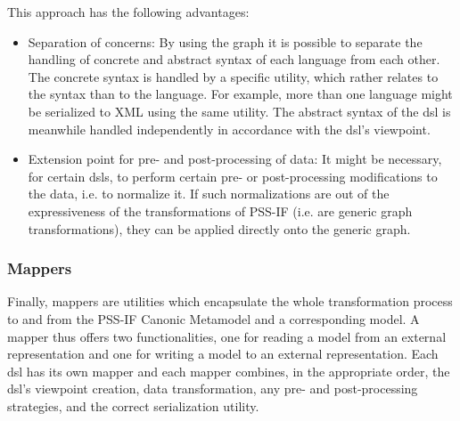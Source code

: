 This approach has the following advantages:

\begin{itemize}
\item Separation of concerns: By using the graph it is possible to separate the handling of concrete and abstract syntax of each language from each other. The concrete syntax is handled by a specific utility, which rather relates to the syntax than to the language. For example, more than one language might be serialized to XML using the same utility. The abstract syntax of the \gls{dsl} is meanwhile handled independently in accordance with the \gls{dsl}'s viewpoint.
\item Extension point for pre- and post-processing of data: It might be necessary, for certain \glspl{dsl}, to perform certain pre- or post-processing modifications to the data, i.e. to normalize it. If such normalizations are out of the expressiveness of the transformations of PSS-IF (i.e. are generic graph transformations), they can be applied directly onto the generic graph.
\end{itemize}

\subsubsection{Mappers}

Finally, mappers are utilities which encapsulate the whole transformation process to and from the PSS-IF Canonic Metamodel and a corresponding model. A mapper thus offers two functionalities, one for reading a model from an external representation and one for writing a model to an external representation. Each \gls{dsl} has its own mapper and each mapper combines, in the appropriate order, the \gls{dsl}'s viewpoint creation, data transformation, any pre- and post-processing strategies, and the correct serialization utility.